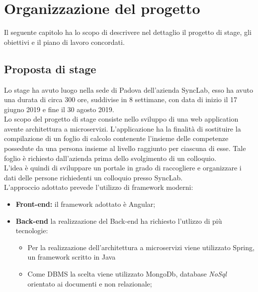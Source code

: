 
\chapter{Organizzazione del progetto}
\label{cap:organizzazione-del-progetto}
Il seguente capitolo ha lo scopo di descrivere nel dettaglio il progetto di stage, gli obiettivi e il piano di lavoro concordati.

\section{Proposta di stage}
Lo stage ha avuto luogo nella sede di Padova dell'azienda SyncLab, esso ha avuto una durata di circa 300 ore, suddivise in 8 settimane, con data di inizio il 17 giugno 2019 e fine il 30 agosto 2019. \\
Lo scopo del progetto di stage consiste nello sviluppo di una \gls{web application} avente architettura a \gls{microservizi}.
L'applicazione ha la finalità di sostituire la compilazione di un foglio di calcolo contenente l'insieme delle competenze possedute da una persona insieme al livello raggiunto per ciascuna di esse. Tale foglio è richiesto dall'azienda prima dello svolgimento di un colloquio.\\
L'idea è quindi di sviluppare un portale in grado di raccogliere e organizzare i dati delle persone richiedenti un colloquio presso SyncLab.\\
L'approccio adottato prevede l'utilizzo di \gls{framework} moderni:

\begin{itemize}
	\item \textbf{Front-end:} il \gls{framework} adottato è \gls{Angular};
	\item \textbf{Back-end} la realizzazione del Back-end ha richiesto l'utlizzo di più tecnologie:
	\begin{itemize}
		\item Per la realizzazione dell'architettura a microservizi viene utilizzato \gls{Spring}, un \gls{framework} scritto in \gls{Java}
		\item Come \gls{DBMS} la scelta viene utilizzato \gls{MongoDb}, database \textit{NoSql} orientato ai documenti e non relazionale;
	\end{itemize}
\end{itemize}

